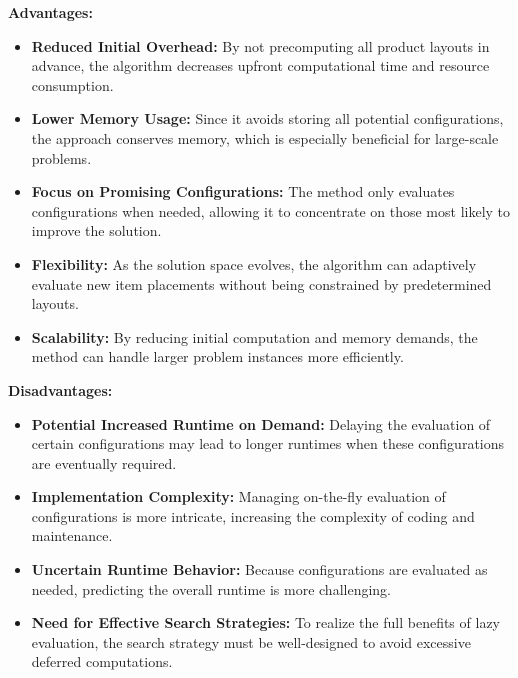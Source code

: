 \documentclass[a4paper]{article}
\begin{document}
\noindent\textbf{Advantages:} 
\begin{itemize}
        \item \textbf{Reduced Initial Overhead:} By not precomputing all product layouts in advance, the algorithm decreases upfront computational time and resource consumption.
        \item \textbf{Lower Memory Usage:} Since it avoids storing all potential configurations, the approach conserves memory, which is especially beneficial for large-scale problems.
        \item \textbf{Focus on Promising Configurations:} The method only evaluates configurations when needed, allowing it to concentrate on those most likely to improve the solution.
        \item \textbf{Flexibility:} As the solution space evolves, the algorithm can adaptively evaluate new item placements without being constrained by predetermined layouts.
        \item \textbf{Scalability:} By reducing initial computation and memory demands, the method can handle larger problem instances more efficiently.
    \end{itemize}

\vspace{0.35cm}

\noindent\textbf{Disadvantages:}
\begin{itemize}
        \item \textbf{Potential Increased Runtime on Demand:} Delaying the evaluation of certain configurations may lead to longer runtimes when these configurations are eventually required.
        \item \textbf{Implementation Complexity:} Managing on-the-fly evaluation of configurations is more intricate, increasing the complexity of coding and maintenance.
        \item \textbf{Uncertain Runtime Behavior:} Because configurations are evaluated as needed, predicting the overall runtime is more challenging.
        \item \textbf{Need for Effective Search Strategies:} To realize the full benefits of lazy evaluation, the search strategy must be well-designed to avoid excessive deferred computations.
    \end{itemize}
\end{document}
